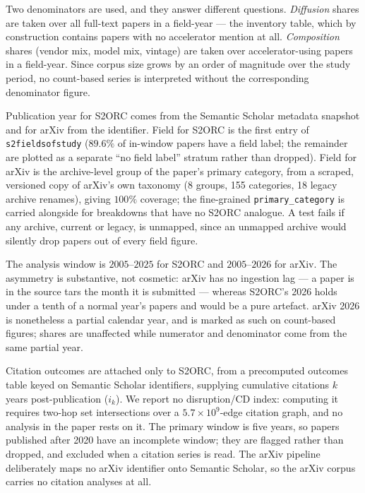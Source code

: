 Two denominators are used, and they answer different questions. \emph{Diffusion}
shares are taken over all full-text papers in a field-year --- the inventory
table, which by construction contains papers with no accelerator mention at all.
\emph{Composition} shares (vendor mix, model mix, vintage) are taken over
accelerator-using papers in a field-year. Since corpus size grows by an order of
magnitude over the study period, no count-based series is interpreted without
the corresponding denominator figure.

Publication year for S2ORC comes from the Semantic Scholar metadata snapshot and
for arXiv from the identifier. Field for S2ORC is the first entry of
\texttt{s2fieldsofstudy} ($89.6\%$ of in-window papers have a field label; the
remainder are plotted as a separate ``no field label'' stratum rather than
dropped). Field for arXiv is the archive-level group of the paper's primary
category, from a scraped, versioned copy of arXiv's own taxonomy (8 groups, 155
categories, 18 legacy archive renames), giving $100\%$ coverage; the
fine-grained \texttt{primary\_category} is carried alongside for breakdowns that
have no S2ORC analogue. A test fails if any archive, current or legacy, is
unmapped, since an unmapped archive would silently drop papers out of every
field figure.

The analysis window is $2005$--$2025$ for S2ORC and $2005$--$2026$ for arXiv.
The asymmetry is substantive, not cosmetic: arXiv has no ingestion lag --- a
paper is in the source tars the month it is submitted --- whereas S2ORC's 2026
holds under a tenth of a normal year's papers and would be a pure artefact.
arXiv 2026 is nonetheless a partial calendar year, and is marked as such on
count-based figures; shares are unaffected while numerator and denominator come
from the same partial year.

Citation outcomes are attached only to S2ORC, from a precomputed
outcomes table keyed on Semantic Scholar identifiers, supplying cumulative
citations $k$ years post-publication ($i_k$). We report no disruption/CD index:
computing it requires two-hop set intersections over a $5.7\times10^9$-edge
citation graph, and no analysis in the paper rests on it. The primary window is five years, so papers published after 2020 have an
incomplete window; they are flagged rather than dropped, and excluded when a
citation series is read. The arXiv pipeline deliberately maps no arXiv
identifier onto Semantic Scholar, so the arXiv corpus carries no citation
analyses at all.

